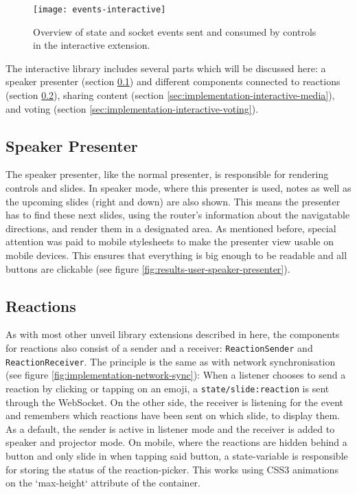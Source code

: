 \begin{figure}
\centering
\texttt{[image: events-interactive]}
\caption{Overview of state and socket events sent and consumed by controls in the interactive extension.}
\label{fig:implementation-events-interactive}
\end{figure}

The interactive library includes several parts which will be discussed here: a speaker presenter (section \ref{sec:implementation-interactive-speaker-presenter}) and different components connected to reactions (section \ref{sec:implementation-interactive-reactions}), sharing content (section \ref{sec:implementation-interactive-media}), and voting (section \ref{sec:implementation-interactive-voting}).

\subsection{Speaker Presenter}
\label{sec:implementation-interactive-speaker-presenter}

The speaker presenter, like the normal presenter, is responsible for rendering controls and slides. In speaker mode, where this presenter is used, notes as well as the upcoming slides (right and down) are also shown.
This means the presenter has to find these next slides, using the router's information about the navigatable directions, and render them in a designated area. As mentioned before, special attention was paid to mobile stylesheets to make the presenter view usable on mobile devices. This ensures that everything is big enough to be readable and all buttons are clickable (see figure \ref{fig:results-user-speaker-presenter}).

\subsection{Reactions}
\label{sec:implementation-interactive-reactions}
As with most other unveil library extensions described in here, the components for reactions also consist of a sender and a receiver: \texttt{ReactionSender} and \texttt{ReactionReceiver}. The principle is the same as with network synchronisation (see figure \ref{fig:implementation-network-sync}): When a listener chooses to send a reaction by clicking or tapping on an emoji, a \texttt{state/slide:reaction} is sent through the WebSocket. On the other side, the receiver is listening for the event and remembers which reactions have been sent on which slide, to display them. As a default, the sender is active in listener mode and the receiver is added to speaker and projector mode. On mobile, where the reactions are hidden behind a button and only slide in when tapping said button, a state-variable is responsible for storing the status of the reaction-picker. This works using CSS3 animations on the `max-height` attribute of the container.

